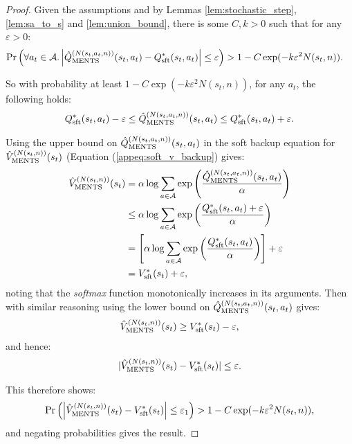     \begin{proof}
        Given the assumptions and by Lemmas \ref{lem:stochastic_step}, \ref{lem:sa_to_s} and \ref{lem:union_bound}, there is some $C,k>0$ such that for any $\varepsilon>0$:
        \begin{align}
            \Pr\left(\forall a_t\in\mathcal{A}. \left|{\hat{Q}^{(N(s_t,a_t,n))}_{{\textnormal{MENTS}}}}(s_t,a_t)-Q_{{\textnormal{sft}}}^*(s_t,a_t)\right|\leq \varepsilon\right) &> 1-C \exp(-k \varepsilon^2 N(s_t,n)).
        \end{align}
        
        So with probability at least $1-C \exp(-k \varepsilon^2 N(s_t,n))$, for any $a_t$, the following holds:
        \begin{align}
            Q_{{\textnormal{sft}}}^*(s_t,a_t) - \varepsilon \leq {\hat{Q}^{(N(s_t,a_t,n))}_{{\textnormal{MENTS}}}}(s_t,a_t) \leq Q_{{\textnormal{sft}}}^*(s_t,a_t) + \varepsilon. 
        \end{align}
        
        Using the upper bound on ${\hat{Q}^{(N(s_t,a_t,n))}_{{\textnormal{MENTS}}}}(s_t,a_t)$ in the soft backup equation for ${\hat{V}^{(N(s_t,n))}_{{\textnormal{MENTS}}}}(s_t)$ (Equation (\ref{appeq:soft_v_backup}) gives:
        \begin{align}
            {\hat{V}^{(N(s_t,n))}_{{\textnormal{MENTS}}}}(s_t) &= \alpha \log \sum_{a\in\mathcal{A}} 
                    \exp\left(\frac{{\hat{Q}^{(N(s_t,a_t,n))}_{{\textnormal{MENTS}}}}(s_t,a_t)}{\alpha}\right) \\
                &\leq \alpha \log \sum_{a\in\mathcal{A}} \exp\left(\frac{Q_{{\textnormal{sft}}}^*(s_t,a_t)+\varepsilon}{\alpha}\right) \\
                &= \left[\alpha \log \sum_{a\in\mathcal{A}} \exp\left(\frac{Q_{{\textnormal{sft}}}^*(s_t,a_t)}{\alpha}\right)\right] 
                    + \varepsilon \\
                &= V_{{\textnormal{sft}}}^*(s_t) + \varepsilon,
        \end{align}
        noting that the \textit{softmax} function monotonically increases in its arguments. Then with similar reasoning using the lower bound on ${\hat{Q}^{(N(s_t,a_t,n))}_{{\textnormal{MENTS}}}}(s_t,a_t)$ gives:
        \begin{align}
            {\hat{V}^{(N(s_t,n))}_{{\textnormal{MENTS}}}}(s_t) \geq V_{{\textnormal{sft}}}^*(s_t) - \varepsilon,
        \end{align}
        and hence:
        \begin{align}
            |{\hat{V}^{(N(s_t,n))}_{{\textnormal{MENTS}}}}(s_t)-V_{{\textnormal{sft}}}^*(s_t)| \leq \varepsilon.
        \end{align}
        
        This therefore shows: 
        \begin{align}
            \Pr\left(\left|{\hat{V}^{(N(s_t,n))}_{{\textnormal{MENTS}}}}(s_t)-V_{{\textnormal{sft}}}^*(s_t)\right| \leq \varepsilon_1\right) > 1-C \exp(-k \varepsilon^2 N(s_t,n)),
        \end{align}
        and negating probabilities gives the result.
    \end{proof}










